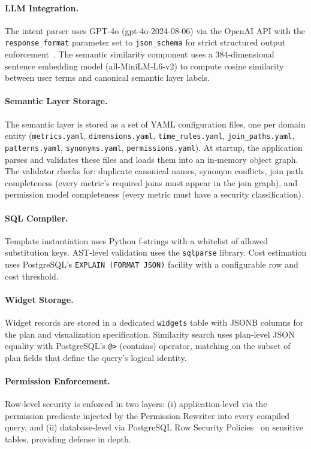 \documentclass[11pt]{article}
\begin{document}
\paragraph{LLM Integration.} The intent parser uses GPT‑4o (gpt‑4o‑2024‑08‑06) via the OpenAI API with the \texttt{response\_format} parameter set to \texttt{json\_schema} for strict structured output enforcement~\cite{openai2024structured}. The semantic similarity component uses a 384‑dimensional sentence embedding model (all‑MiniLM‑L6‑v2) to compute cosine similarity between user terms and canonical semantic layer labels.

\paragraph{Semantic Layer Storage.} The semantic layer is stored as a set of YAML configuration files, one per domain entity (\texttt{metrics.yaml}, \texttt{dimensions.yaml}, \texttt{time\_rules.yaml}, \texttt{join\_paths.yaml}, \texttt{patterns.yaml}, \texttt{synonyms.yaml}, \texttt{permissions.yaml}). At startup, the application parses and validates these files and loads them into an in‑memory object graph. The validator checks for: duplicate canonical names, synonym conflicts, join path completeness (every metric's required joins must appear in the join graph), and permission model completeness (every metric must have a security classification).

\paragraph{SQL Compiler.} Template instantiation uses Python f‑strings with a whitelist of allowed substitution keys. AST‑level validation uses the \texttt{sqlparse} library. Cost estimation uses PostgreSQL's \texttt{EXPLAIN (FORMAT JSON)} facility with a configurable row and cost threshold.

\paragraph{Widget Storage.} Widget records are stored in a dedicated \texttt{widgets} table with JSONB columns for the plan and visualization specification. Similarity search uses plan‑level JSON equality with PostgreSQL's \texttt{@>} (contains) operator, matching on the subset of plan fields that define the query's logical identity.

\paragraph{Permission Enforcement.} Row‑level security is enforced in two layers: (i) application‑level via the permission predicate injected by the Permission Rewriter into every compiled query, and (ii) database‑level via PostgreSQL Row Security Policies~\cite{postgresql} on sensitive tables, providing defense in depth.
\end{document}
